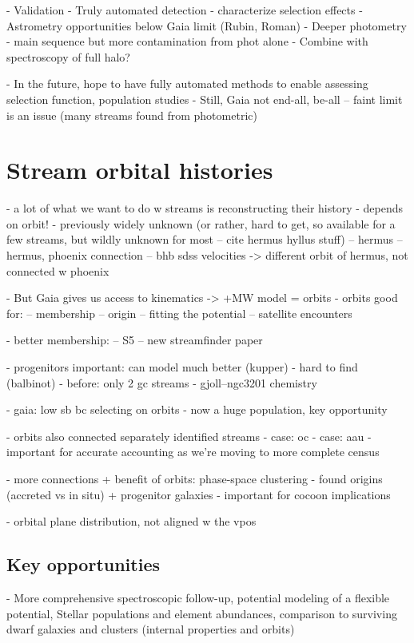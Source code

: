 \documentclass[final,5p,times,twocolumn,authoryear]{elsarticle}
\begin{document}
- Validation
- Truly automated detection - characterize selection effects
- Astrometry opportunities below Gaia limit (Rubin, Roman)
- Deeper photometry - main sequence but more contamination from phot alone
    - Combine with spectroscopy of full halo?

- In the future, hope to have fully automated methods to enable assessing selection function, population studies
- Still, Gaia not end-all, be-all -- faint limit is an issue (many streams found from photometric)


\section{Stream orbital histories}
\label{sec:orbits}
- a lot of what we want to do w streams is reconstructing their history
- depends on orbit!
- previously widely unknown (or rather, hard to get, so available for a few streams, but wildly unknown for most -- cite hermus hyllus stuff)
-- hermus \citep{grillmair:2014}
-- hermus, phoenix connection \citep{gc:2016}
-- bhb sdss velocities -> different orbit of hermus, not connected w phoenix \citep{martin:2018}

- But Gaia gives us access to kinematics -> +MW model = orbits
- orbits good for:
-- membership
-- origin
-- fitting the potential
-- satellite encounters

- better membership:
-- S5 \citep{li:2022}
-- new streamfinder paper


- progenitors important: can model much better (kupper)
- hard to find (balbinot)
- before: only 2 gc streams
- gjoll--ngc3201 chemistry \citep{hansen:2020}

- gaia: low sb bc selecting on orbits
- now a huge population, key opportunity

- orbits also connected separately identified streams
- case: oc
- case: aau \citep{li:2021}
- important for accurate accounting as we're moving to more complete census

- more connections + benefit of orbits: phase-space clustering \citep{bonaca:2021}
- found origins (accreted vs in situ) + progenitor galaxies
- important for cocoon implications

- orbital plane distribution, not aligned w the vpos \citep{riley:2020}

\subsection{Key opportunities}
- More comprehensive spectroscopic follow-up, potential modeling of a flexible potential, Stellar populations and element abundances, comparison to surviving dwarf galaxies and clusters (internal properties and orbits)
\end{document}
